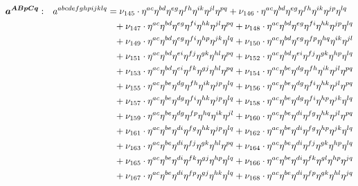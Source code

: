 \documentclass[a4paper,12pt, DIV=14, BCOR=5mm, twoside, headsepline]{scrbook}
\begin{document}
\begin{align}\label{LorentzArea4}
\begin{alignedat}{2}
\boldsymbol{a^{ABpCq}}&: \ \ \ & a^{abcdefghpijklq}  &=
\nu_{145}\cdot\eta^{ac}\eta^{bd}\eta^{eg}\eta^{fh}\eta^{ik}\eta^{jl}\eta^{pq}+\nu_{146}\cdot\eta^{ac}\eta^{bd}\eta^{eg}\eta^{fh}\eta^{ik}\eta^{jp}\eta^{lq}\\
& & &\hphantom{=}
+\nu_{147}\cdot\eta^{ac}\eta^{bd}\eta^{eg}\eta^{fi}\eta^{hk}\eta^{jl}\eta^{pq}+\nu_{148}\cdot\eta^{ac}\eta^{bd}\eta^{eg}\eta^{fi}\eta^{hk}\eta^{jp}\eta^{lq}\\
& & &\hphantom{=}
+\nu_{149}\cdot\eta^{ac}\eta^{bd}\eta^{eg}\eta^{fi}\eta^{hp}\eta^{jk}\eta^{lq}+\nu_{150}\cdot\eta^{ac}\eta^{bd}\eta^{eg}\eta^{fp}\eta^{hq}\eta^{ik}\eta^{jl}\\
& & &\hphantom{=}
+\nu_{151}\cdot\eta^{ac}\eta^{bd}\eta^{ei}\eta^{fj}\eta^{gk}\eta^{hl}\eta^{pq}+\nu_{152}\cdot\eta^{ac}\eta^{bd}\eta^{ei}\eta^{fj}\eta^{gk}\eta^{hp}\eta^{lq}\\
& & &\hphantom{=}
+\nu_{153}\cdot\eta^{ac}\eta^{bd}\eta^{ei}\eta^{fk}\eta^{gj}\eta^{hl}\eta^{pq}+\nu_{154}\cdot\eta^{ac}\eta^{be}\eta^{dg}\eta^{fh}\eta^{ik}\eta^{jl}\eta^{pq}\\
& & &\hphantom{=}
+\nu_{155}\cdot\eta^{ac}\eta^{be}\eta^{dg}\eta^{fh}\eta^{ik}\eta^{jp}\eta^{lq}+\nu_{156}\cdot\eta^{ac}\eta^{be}\eta^{dg}\eta^{fi}\eta^{hk}\eta^{jl}\eta^{pq}\\
& & &\hphantom{=}
+\nu_{157}\cdot\eta^{ac}\eta^{be}\eta^{dg}\eta^{fi}\eta^{hk}\eta^{jp}\eta^{lq}+\nu_{158}\cdot\eta^{ac}\eta^{be}\eta^{dg}\eta^{fi}\eta^{hp}\eta^{jk}\eta^{lq}\\
& & &\hphantom{=}
+\nu_{159}\cdot\eta^{ac}\eta^{be}\eta^{dg}\eta^{fp}\eta^{hq}\eta^{ik}\eta^{jl}+\nu_{160}\cdot\eta^{ac}\eta^{be}\eta^{di}\eta^{fg}\eta^{hk}\eta^{jl}\eta^{pq}\\
& & &\hphantom{=}
+\nu_{161}\cdot\eta^{ac}\eta^{be}\eta^{di}\eta^{fg}\eta^{hk}\eta^{jp}\eta^{lq}+\nu_{162}\cdot\eta^{ac}\eta^{be}\eta^{di}\eta^{fg}\eta^{hp}\eta^{jk}\eta^{lq}\\
& & &\hphantom{=}
+\nu_{163}\cdot\eta^{ac}\eta^{be}\eta^{di}\eta^{fj}\eta^{gk}\eta^{hl}\eta^{pq}+\nu_{164}\cdot\eta^{ac}\eta^{be}\eta^{di}\eta^{fj}\eta^{gk}\eta^{hp}\eta^{lq}\\
& & &\hphantom{=}
+\nu_{165}\cdot\eta^{ac}\eta^{be}\eta^{di}\eta^{fk}\eta^{gj}\eta^{hp}\eta^{lq}+\nu_{166}\cdot\eta^{ac}\eta^{be}\eta^{di}\eta^{fk}\eta^{gl}\eta^{hp}\eta^{jq}\\
& & &\hphantom{=}
+\nu_{167}\cdot\eta^{ac}\eta^{be}\eta^{di}\eta^{fp}\eta^{gj}\eta^{hk}\eta^{lq}+\nu_{168}\cdot\eta^{ac}\eta^{be}\eta^{di}\eta^{fp}\eta^{gk}\eta^{hl}\eta^{jq}\\

\end{alignedat}
\end{align}
\end{document}
